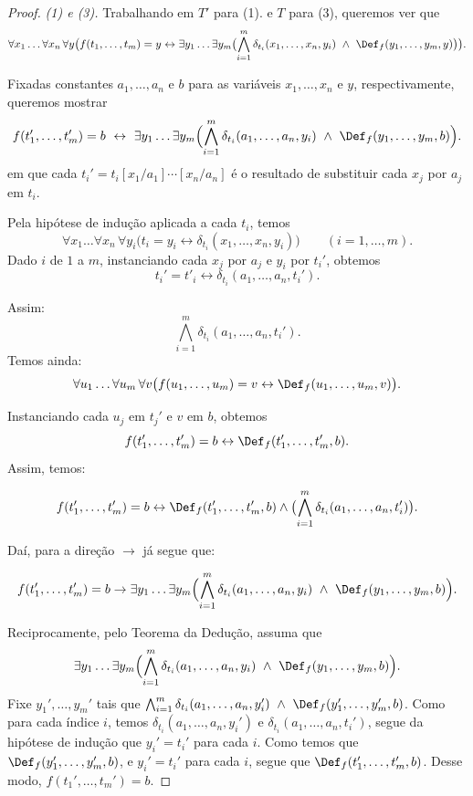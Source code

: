 \begin{proof}
\smallskip
\emph{(1) e (3).}
Trabalhando em $T'$ para (1). e $T$ para (3), queremos ver que
\[
\forall x_1\ldots\forall x_n\,\forall y\bigl(f(t_1,\ldots,t_m)=y \leftrightarrow \exists y_1\ldots\exists y_m\bigl(\bigwedge_{i=1}^m \delta_{t_i}(x_1,\ldots,x_n,y_i)\ \wedge\ \Def_f(y_1,\ldots,y_m,y)\bigr)\bigr).
\]

Fixadas constantes $a_1,\ldots,a_n$ e $b$ para as variáveis $x_1,\ldots,x_n$ e $y$, respectivamente, queremos mostrar
\[
f(t_1',\ldots,t_m')=b\ \leftrightarrow\ \exists y_1\ldots\exists y_m\Bigl(\bigwedge_{i=1}^m \delta_{t_i}(a_1,\ldots,a_n,y_i)\ \wedge\ \Def_f(y_1,\ldots,y_m,b)\Bigr).
\]
em que cada $t_i'=t_i[x_1/a_1]\cdots[x_n/a_n]$ é o resultado de substituir cada $x_j$ por $a_j$ em $t_i$.

Pela hipótese de indução aplicada a cada $t_i$, temos
\[
\forall x_1\ldots\forall x_n\,\forall y_i\bigl(t_i=y_i\leftrightarrow \delta_{t_i}(x_1,\ldots,x_n,y_i)\bigr)\qquad (i=1,\ldots,m).
\]
Dado $i$ de $1$ a $m$, instanciando cada $x_j$ por $a_j$ e $y_i$ por $t_i'$, obtemos
\[
t_i'=t'_i\leftrightarrow \delta_{t_i}(a_1,\ldots,a_n,t_i').
\]

Assim:
\[
\bigwedge_{i=1}^m \delta_{t_i}(a_1,\ldots,a_n,t_i').
\]
Temos ainda:
\[
\forall u_1\ldots\forall u_m\,\forall v\bigl(f(u_1,\ldots,u_m)=v\leftrightarrow \Def_f(u_1,\ldots,u_m,v)\bigr).
\]

Instanciando cada $u_j$ em $t_j'$ e $v$ em $b$, obtemos
\[
f(t_1',\ldots,t_m')=b\leftrightarrow \Def_f(t_1',\ldots,t_m',b).
\]
Assim, temos:

\[
f(t_1',\ldots,t_m')=b\leftrightarrow\Def_f(t_1',\ldots,t_m',b)\wedge \bigl(\bigwedge_{i=1}^m \delta_{t_i}(a_1,\ldots,a_n,t_i')\bigr).
\]

Daí, para a direção $\rightarrow$ já segue que:

\[
f(t_1',\ldots,t_m')=b\rightarrow \exists y_1\ldots\exists y_m\Bigl(\bigwedge_{i=1}^m \delta_{t_i}(a_1,\ldots,a_n,y_i)\ \wedge\ \Def_f(y_1,\ldots,y_m,b)\Bigr).
\]

Reciprocamente, pelo Teorema da Dedução, assuma que
\[
\exists y_1\ldots\exists y_m\Bigl(\bigwedge_{i=1}^m \delta_{t_i}(a_1,\ldots,a_n,y_i)\ \wedge\ \Def_f(y_1,\ldots,y_m,b)\Bigr).
\]
Fixe $y_1',\ldots,y_m'$ tais que $\bigwedge_{i=1}^m \delta_{t_i}(a_1,\ldots,a_n,y_i')\ \wedge\ \Def_f(y_1',\ldots,y_m',b)$.
Como para cada índice $i$, temos $\delta_{t_i}(a_1,\ldots,a_n,y_i')$ e $\delta_{t_i}(a_1,\ldots,a_n,t_i')$, segue da hipótese de indução que $y_i'=t_i'$ para cada $i$.
Como temos que $\Def_f(y_1',\ldots,y_m',b)$, e $y_i'=t_i'$ para cada $i$, segue que $\Def_f(t_1',\ldots,t_m',b)$.
Desse modo, $f(t_1',\ldots,t_m')=b$.


\end{proof}

